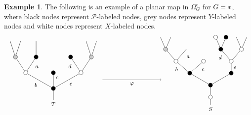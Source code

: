 \documentclass[a4paper,10pt
,draft
]{article}%
\numberwithin{equation}{section}
\numberwithin{figure}{section}
\theoremstyle{definition} %
\newtheorem{example}[equation]{Example}%
\newcommand{\1}{\ensuremath{\mathbbm 1}}%
\begin{document}
\begin{example}\label{REGALTERNMAP EX}
The following  is an example of a planar map in $\Omega_G^e$ for $G=\**$, where black nodes represent $\mathcal{P}$-labeled nodes, grey nodes represent $Y$-labeled nodes and white nodes represent $X$-labeled nodes.
\[
\begin{tikzpicture}[grow=up,auto,level distance=2.3em,
every node/.style = {font=\footnotesize},
dummy/.style={circle,draw,inner sep=0pt,minimum size=2.1mm}]
	\tikzstyle{level 2}=[sibling distance = 4em]
	\tikzstyle{level 3}=[sibling distance = 3em]
	\tikzstyle{level 4}=[sibling distance = 1.5em]
	\node at (0,0.25) {$T$}
		child{node [dummy,fill = black] {}
			child{node [dummy,fill=white] {}
				child{node [dummy,fill = black!20] {}
					child
					child
				}
				child{node [dummy,fill = black] {}
				edge from parent node [near end] {$d$}}
			edge from parent node [swap] {$e$}}
			child{node [dummy,fill=black] {}
			edge from parent node [swap, near end] {$c$}}
			child{node [dummy,fill=white] {}
				child{node [dummy,fill = black] {}
					child
				edge from parent node [swap, near end] {$a\phantom{d}$}}
				child{node [dummy,fill = black!20] {}
					child
					child
				}
			edge from parent node {$b$}}
		};
\begin{scope}[level distance=1.75em]
	\tikzstyle{level 3}=[sibling distance = 6em]
	\tikzstyle{level 4}=[sibling distance = 4em]
	\tikzstyle{level 5}=[sibling distance = 3em]
	\tikzstyle{level 6}=[sibling distance = 1.5em]
	\tikzstyle{level 7}=[sibling distance = 0.75em]
	\node at (8,0) {$S$}
		child{node [dummy,fill = white] {}
			child{node [dummy,fill = black] {}
				child{node [dummy,fill = black] {}
					child{node [dummy,fill=white] {}
						child{node [dummy,fill = white] {}
							child
							child
						}
						child{node [dummy,fill = black] {}
							child{node [dummy,fill=black] {}
						}
							child{node [dummy,fill=white] {}}
						edge from parent node [near end] {$d$}}
					edge from parent node [swap] {$e\phantom{1}$}}
				}
				child{node [dummy,fill = black] {}
					child{node [dummy,fill=white] {}
					edge from parent node [swap, near end] {$c\phantom{1}$}}
					child{node [dummy,fill=white] {}
						child{
						edge from parent node [swap,near end] {$a\phantom{d}$}}
						child{node [dummy,fill = black!20] {}
							child
							child
						}
					edge from parent node [near end] {$\phantom{1}b$}}
				}
			}
		};
\end{scope}
	\draw [->] (2.5,1.5) -- node [swap] {$\varphi$} (5.5,1.5);
\end{tikzpicture}
\]
\end{example}
\end{document}

